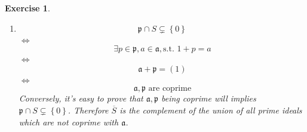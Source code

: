 \documentclass{article}
\theoremstyle{breakstyle}
\newtheorem{exercise}{Exercise}
\begin{document}
\begin{exercise}
\begin{enumerate}[label=({\roman*})]
            We only have to prove $\overline{S}$ is the unique minimal one,
            which is trivial since the family of sets, which consists of prime ideals disjoint from $S$, has a unique maximal element
            (final object, where morphisms taken under inclusion).
        \item 
            $$
            \mathfrak{p}\cap S\subsetneq \left\{ 0 \right\} 
            $$
            $\Leftrightarrow$ 
            $$
            \exists p\in \mathfrak{p},a\in \mathfrak{a},\text{s.t. }1+p=a
            $$
            $\Leftrightarrow$ 
            $$
            \mathfrak{a}+\mathfrak{p}=(1)
            $$
            $\Leftrightarrow$ 
            $$
            \mathfrak{a},\mathfrak{p}\text{ are coprime}
            $$
            Conversely, it's easy to prove that $\mathfrak{a},\mathfrak{p}$ being coprime will implies $\mathfrak{p}\cap S\subsetneq \left\{ 0 \right\} $.
            Therefore $\overline{S}$ is the complement of the union of all prime ideals which are not coprime with $\mathfrak{a}$.
    \end{enumerate}
\end{exercise}
\end{document}
